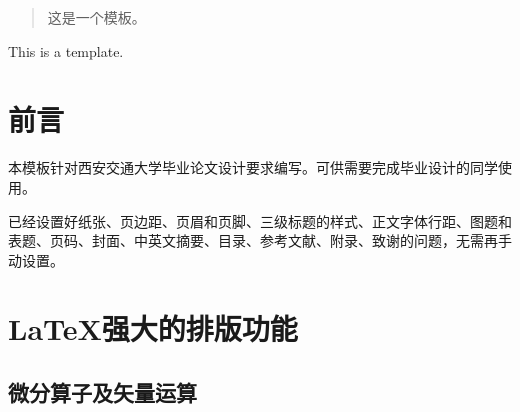 \documentclass[bachelor]{XJTUthesis}
\begin{document}
\cover


\tableofcontents
\thispagestyle{empty}
\setcounter{page}{0}
\newpage

\begin{abstract}
这是一个模板。
\end{abstract}
\newpage
\begin{eabstract}
This is a template.
\end{eabstract}

\chapter{前言}
本模板针对西安交通大学毕业论文设计要求编写。可供需要完成毕业设计的同学使用。\par
已经设置好纸张、页边距、页眉和页脚、三级标题的样式、正文字体行距、图题和表题、页码、封面、中英文摘要、目录、参考文献、附录、致谢的问题，无需再手动设置。

\chapter{\LaTeX 强大的排版功能}
\section{微分算子及矢量运算}
\end{document}
